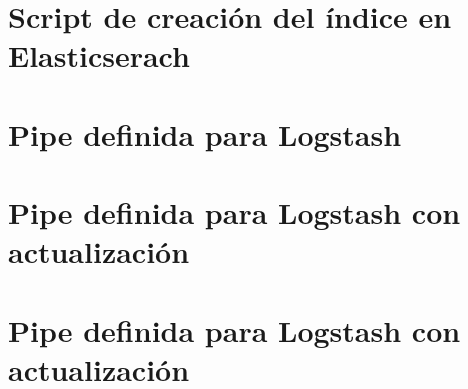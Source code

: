\newpage
\chapter{Script de creación del índice en Elasticserach}\label{apend.G}


\newpage
\chapter{Pipe definida para Logstash}\label{apend.H}



\newpage
\chapter{Pipe definida para Logstash con actualización}\label{apend.I}



\newpage
\chapter{Pipe definida para Logstash con actualización}\label{apend.J}



